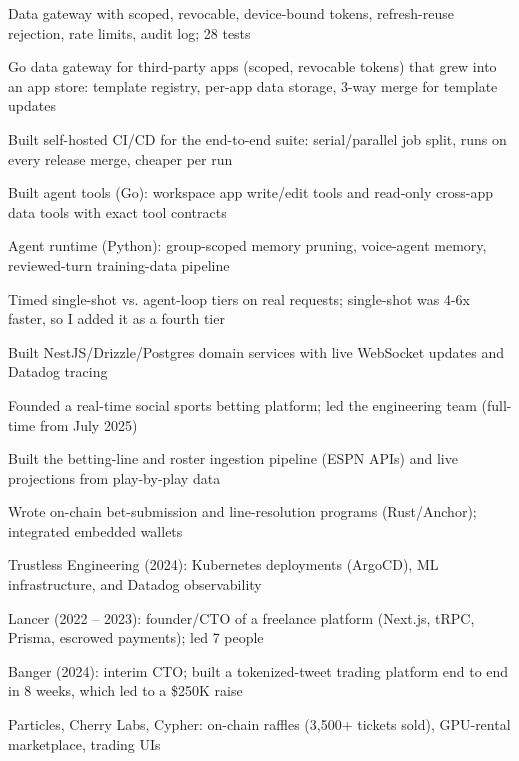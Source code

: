 \documentclass[print]{jack-resume}
\begin{document}
\begin{tightemize}
    \item Data gateway with scoped, revocable, device-bound tokens, refresh-reuse rejection, rate limits, audit log; 28 tests
    \item Go data gateway for third-party apps (scoped, revocable tokens) that grew into an app store: template registry, per-app data storage, 3-way merge for template updates
    \item Built self-hosted CI/CD for the end-to-end suite: serial/parallel job split, runs on every release merge, cheaper per run
    \item Built agent tools (Go): workspace app write/edit tools and read-only cross-app data tools with exact tool contracts
    \item Agent runtime (Python): group-scoped memory pruning, voice-agent memory, reviewed-turn training-data pipeline
    \item Timed single-shot vs. agent-loop tiers on real requests; single-shot was 4-6x faster, so I added it as a fourth tier
\end{tightemize}
\sectionsep

\begin{tightemize}
    \item Built NestJS/Drizzle/Postgres domain services with live WebSocket updates and Datadog tracing
    \item Founded a real-time social sports betting platform; led the engineering team (full-time from July 2025)
    \item Built the betting-line and roster ingestion pipeline (ESPN APIs) and live projections from play-by-play data
    \item Wrote on-chain bet-submission and line-resolution programs (Rust/Anchor); integrated embedded wallets
\end{tightemize}
\sectionsep

\begin{tightemize}
    \item Trustless Engineering (2024): Kubernetes deployments (ArgoCD), ML infrastructure, and Datadog observability
    \item Lancer (2022 – 2023): founder/CTO of a freelance platform (Next.js, tRPC, Prisma, escrowed payments); led 7 people
    \item Banger (2024): interim CTO; built a tokenized-tweet trading platform end to end in 8 weeks, which led to a \$250K raise
    \item Particles, Cherry Labs, Cypher: on-chain raffles (3,500+ tickets sold), GPU-rental marketplace, trading UIs
\end{tightemize}
\sectionsep
\end{document}
